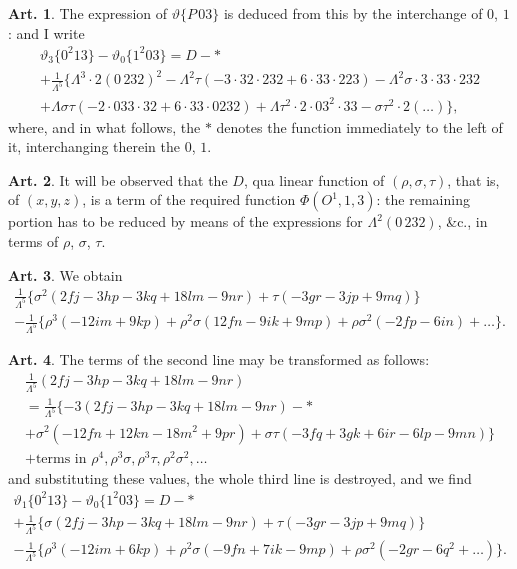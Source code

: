 \documentclass[12pt,a4paper]{article}
\theoremstyle{definition}
\newtheorem{art}{Art.}[section]
\begin{document}
\begin{art}\label{art:68}
The expression of $\vartheta\{P\,03\}$ is deduced from this by the interchange of $0$, $1$: and I write
\begin{multline*}
\vartheta_3\{0^2 13\} - \vartheta_0\{1^2 03\} = D - * \\
+ \frac{1}{\Lambda^5}\{\Lambda^3 \cdot 2(0\,232)^2 - \Lambda^2\tau(-3 \cdot 32 \cdot 232 + 6 \cdot 33 \cdot 223) - \Lambda^2\sigma \cdot 3 \cdot 33 \cdot 232 \\
+ \Lambda\sigma\tau(-2 \cdot 033 \cdot 32 + 6 \cdot 33 \cdot 0232) + \Lambda\tau^2 \cdot 2 \cdot 03^2 \cdot 33 - \sigma\tau^2 \cdot 2(\ldots)\},
\end{multline*}
where, and in what follows, the $*$ denotes the function immediately to the left of it, interchanging therein the $0$, $1$.
\end{art}

\newpage
\begin{art}\label{art:69}
It will be observed that the $D$, qua linear function of $(\rho, \sigma, \tau)$, that is, of $(x, y, z)$, is a term of the required function $\Phi(O^1, 1, 3)$: the remaining portion has to be reduced by means of the expressions for $\Lambda^2(0\,232)$, \&c., in terms of $\rho$, $\sigma$, $\tau$.
\end{art}

\begin{art}\label{art:70}
We obtain
\begin{multline*}
\frac{1}{\Lambda^5}\{\sigma^2(2fj - 3hp - 3kq + 18lm - 9nr) + \tau(-3gr - 3jp + 9mq)\} \\
- \frac{1}{\Lambda^5}\{\rho^3(-12im + 9kp) + \rho^2\sigma(12fn - 9ik + 9mp) + \rho\sigma^2(-2fp - 6in) + \ldots\}.
\end{multline*}
\end{art}

\begin{art}\label{art:71}
The terms of the second line may be transformed as follows:
\begin{multline*}
\frac{1}{\Lambda^5}(2fj - 3hp - 3kq + 18lm - 9nr) \\
= \frac{1}{\Lambda^5}\{-3(2fj - 3hp - 3kq + 18lm - 9nr) - * \\
+ \sigma^2(-12fn + 12kn - 18m^2 + 9pr) + \sigma\tau(-3fq + 3gk + 6ir - 6lp - 9mn)\} \\
+ \text{terms in } \rho^4, \rho^3\sigma, \rho^3\tau, \rho^2\sigma^2, \ldots
\end{multline*}
and substituting these values, the whole third line is destroyed, and we find
\begin{multline*}
\vartheta_1\{0^2 13\} - \vartheta_0\{1^2 03\} = D - * \\
+ \frac{1}{\Lambda^5}\{\sigma(2fj - 3hp - 3kq + 18lm - 9nr) + \tau(-3gr - 3jp + 9mq)\} \\
- \frac{1}{\Lambda^5}\{\rho^3(-12im + 6kp) + \rho^2\sigma(-9fn + 7ik - 9mp) + \rho\sigma^2(-2gr - 6q^2 + \ldots)\}.
\end{multline*}
\end{art}
\end{document}
